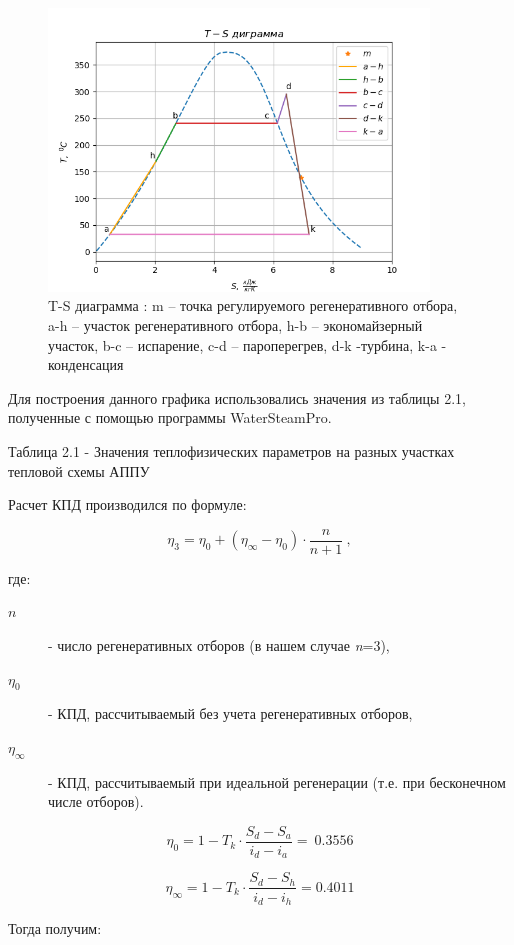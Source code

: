 \begin{figure}[!h]
\center
\includegraphics[width=0.9\textwidth]{media/image5.png}
\caption{T-S диаграмма : m -- точка регулируемого регенеративного отбора,
a-h -- участок регенеративного отбора, h-b -- экономайзерный участок,
b-c -- испарение, c-d -- пароперегрев, d-k -турбина, k-a - конденсация}
\end{figure}

Для построения данного графика использовались значения из таблицы 2.1,
полученные с помощью программы WaterSteamPro.

Таблица 2.1 - Значения теплофизических параметров на разных участках
тепловой схемы АППУ

Расчет КПД производился по формуле:

\[\eta_{3} = \eta_{0} + \left( \eta_{\infty} - \eta_{0} \right) \cdot \frac{n}{n + 1}\ ,\]

\flushleft где:
\begin{description}
	\item[${n}$] - число регенеративных отборов (в нашем случае \emph{n}=3),
	\item[$\eta_{0}$] - КПД, рассчитываемый без учета регенеративных отборов,
	\item[$\eta_\infty$] - КПД, рассчитываемый при идеальной
	регенерации (т.е. при бесконечном числе отборов).
\end{description}

\[\eta_{0} = 1 - T_{k} \cdot \frac{S_{d} - S_{a}}{i_{d} - i_{a}} = \ 0.3556\]

\[\eta_{\infty} = 1 - T_{k} \cdot \frac{S_{d} - S_{h}}{i_{d} - i_{h}} = 0.4011\]

Тогда получим:

